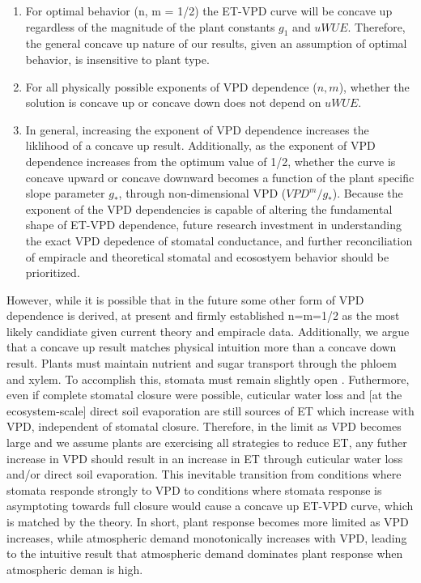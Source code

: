 \documentclass[draft,linenumbers]{agujournal}
\begin{document}
\begin{enumerate}
  \item For optimal behavior (n, m = 1/2) the ET-VPD curve will be
    concave up regardless of the magnitude of the plant constants
    $g_1$ and $uWUE$. Therefore, the general concave up nature of our
    results, given an assumption of optimal behavior, is insensitive
    to plant type.
  \item For all physically possible exponents of VPD dependence ($n,
    m$), whether the solution is concave up or concave down does not
    depend on $uWUE$.
  \item In general, increasing the exponent of VPD dependence
    increases the liklihood of a concave up result. Additionally, as
    the exponent of VPD dependence increases from the optimum value of
    1/2, whether the curve is concave upward or concave downward
    becomes a function of the plant specific slope parameter $g_*$,
    through non-dimensional VPD ($VPD^m/g_*$). Because the exponent of
    the VPD dependencies is capable of altering the fundamental shape
    of ET-VPD dependence, future research investment in understanding
    the exact VPD depedence of stomatal conductance, and further
    reconciliation of empiracle and theoretical stomatal and
    ecosostyem behavior should be prioritized.
\end{enumerate}
However, while it is possible that in the future some other form of
VPD dependence is derived, at present \cite{MEDLYN_2011} and
\cite{Zhou_2014} firmly established n=m=1/2 as the most likely
candidiate given current theory and empiracle data. Additionally, we
argue that a concave up result matches physical intuition more than a
concave down result. Plants must maintain nutrient and sugar transport
through the phloem and xylem. To accomplish this, stomata must remain
slightly open \citep{De_2013, Nikinmaa_2013, Ryan_2014}. Futhermore,
even if complete stomatal closure were possible, cuticular water loss
and [at the ecosystem-scale] direct soil evaporation are still sources
of ET which increase with VPD, independent of stomatal
closure. Therefore, in the limit as VPD becomes large and we assume
plants are exercising all strategies to reduce ET, any futher increase
in VPD should result in an increase in ET through cuticular water loss
and/or direct soil evaporation. This inevitable transition from
conditions where stomata responde strongly to VPD to conditions where
stomata response is asymptoting towards full closure would cause a
concave up ET-VPD curve, which is matched by the theory. In short,
plant response becomes more limited as VPD increases, while
atmospheric demand monotonically increases with VPD, leading to the
intuitive result that atmospheric demand dominates plant response when
atmospheric deman is high.
\end{document}
